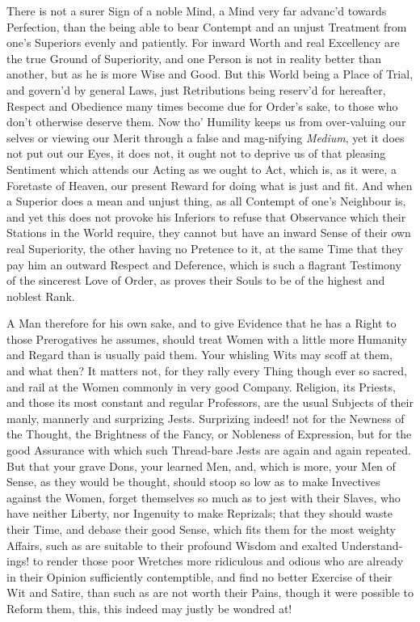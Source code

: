There is not a surer Sign of a noble Mind, a Mind very far advanc'd
towards Perfection, than the being able to bear Contempt and an unjust
Treatment from one's Superiors evenly and patiently. For inward Worth
and real Excellency are the true Ground of Superiority, and one Person
is not in reality better than another, but as he is more Wise and
Good. But this World being a Place of Trial, and govern'd by general
Laws, just Retributions being reserv'd for hereafter, Respect and
Obedience many times become due for Order's sake, to those who don't
otherwise deserve them. Now tho' Humility keeps us from over-valuing
our selves or viewing our Merit through a false and
mag-nifying \textit{Medium}, yet it does not put out our
Eyes, it does not, it ought not to deprive us of that pleasing
Sentiment which attends our Acting as we ought to Act, which is, as it
were, a Foretaste of Heaven, our present Reward for doing what is just
and fit. And when a Superior does a mean and unjust thing, as all
Contempt of one's Neighbour is, and yet this does not provoke his
Inferiors to refuse that Observance which their Stations in the World
require, they cannot but have an inward Sense of their own real
Superiority, the other having no Pretence to it, at the same Time that
they pay him an outward Respect and Deference, which is such a
flagrant Testimony of the sincerest Love of Order, as proves their
Souls to be of the highest and noblest Rank.

A Man therefore for his own sake, and to give Evidence that he has a
Right to those Prerogatives he assumes, should treat Women with a
little more Humanity and Regard than is usually paid  them.
Your whisling Wits may scoff at them, and what then? It matters not,
for they rally every Thing though ever so sacred, and rail at the
Women commonly in very good Company. Religion, its Priests, and those
its most constant and regular Professors, are the usual Subjects of
their manly, mannerly and surprizing Jests. Surprizing indeed! not for
the Newness of the Thought, the Brightness of the Fancy, or Nobleness
of Expression, but for the good Assurance with which such Thread-bare
Jests are again and again repeated. But that your grave Dons, your
learned Men, and, which is more, your Men of Sense, as they would be
thought, should stoop so low as to make Invectives against the Women,
forget themselves so much as to jest with their Slaves, who have
neither Liberty, nor Ingenuity to make Reprizals; that they should
waste their Time, and debase their good Sense, which fits them for the
most weighty Affairs, such as are suitable to their profound Wisdom
and exalted Understand-ings! to render those poor Wretches
more ridiculous and odious who are already in their Opinion
sufficiently contemptible, and find no better Exercise of their Wit
and Satire, than such as are not worth their Pains, though it were
possible to Reform them, this, this indeed may justly be wondred at!

